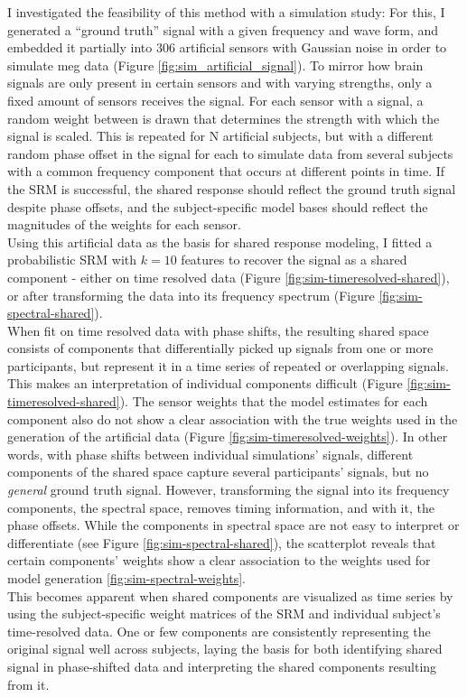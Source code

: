 I investigated the feasibility of this method with a simulation study:
For this, I generated a ``ground truth'' signal with a given frequency and wave form, and embedded it partially into 306 artificial sensors with Gaussian noise in order to simulate \gls{meg} data (Figure \ref{fig:sim_artificial_signal}).
To mirror how brain signals are only present in certain sensors and with varying strengths, only a fixed amount of sensors receives the signal.
For each sensor with a signal, a random weight between is drawn that determines the strength with which the signal is scaled.
This is repeated for N artificial subjects, but with a different random phase offset in the signal for each to simulate data from several subjects with a common frequency component that occurs at different points in time.
If the \gls{SRM} is successful, the shared response should reflect the ground truth signal despite phase offsets, and the subject-specific model bases should reflect the magnitudes of the weights for each sensor.\\
Using this artificial data as the basis for shared response modeling, I fitted a probabilistic \gls{SRM} with $k=10$ features to recover the signal as a shared component - either on time resolved data (Figure \ref{fig:sim-timeresolved-shared}), or after transforming the data into its frequency spectrum (Figure \ref{fig:sim-spectral-shared}).\\
When fit on time resolved data with phase shifts, the resulting shared space consists of components that differentially picked up signals from one or more participants, but represent it in a time series of repeated or overlapping signals.
This makes an interpretation of individual components difficult (Figure \ref{fig:sim-timeresolved-shared}).
The sensor weights that the model estimates for each component also do not show a clear association with the true weights used in the generation of the artificial data (Figure \ref{fig:sim-timeresolved-weights}).
In other words, with phase shifts between individual simulations' signals, different components of the shared space capture several participants' signals, but no \textit{general} ground truth signal.
However, transforming the signal into its frequency components, the spectral space, removes timing information, and with it, the phase offsets.
While the components in spectral space are not easy to interpret or differentiate (see Figure \ref{fig:sim-spectral-shared}), the scatterplot reveals that certain components' weights show a clear association to the weights used for model generation \ref{fig:sim-spectral-weights}.\\
This becomes apparent when shared components are visualized as time series by using the subject-specific weight matrices of the \gls{SRM} and individual subject's time-resolved data.
One or few components are consistently representing the original signal well across subjects, laying the basis for both identifying shared signal in phase-shifted data and interpreting the shared components resulting from it.


